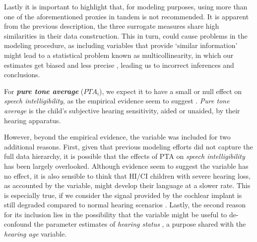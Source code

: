 Lastly it is important to highlight that, for modeling purposes, using more than one of the aforementioned proxies in tandem is not recommended. It is apparent from the previous description, the three surrogate measures share high similarities in their data construction. This in turn, could cause problems in the modeling procedure, as including variables that provide `similar information' might lead to a statistical problem known as multicollinearity, in which our estimates get biased and less precise \cite{Farrar_et_al_1967}, leading us to incorrect inferences and conclusions.
%
\begin{comment}
	for the NH group uses the child's \textit{age} (at recording), the method cannot use the same variable for the other two groups. This is due to the fact that \textit{age} is merely used as a proxy, for the amount of time a child has been developing his(her) language. In that sense, more appropriate variables to use under the HI/CI group would be e.g. the \textit{device length of use}, which approximates the ``hearing age'' of such children, or their \textit{vocabulary size}, which resembles their "lexical age" \citep{Faes_et_al_2021}. For this research, we consider the \textit{device length of use} as the simplest one to implement.
\end{comment}

For \textbf{\textit{pure tone average}} ($PTA_{i}$), we expect it to have a small or null effect on \textit{speech intelligibility}, as the empirical evidence seem to suggest \cite{Boonen_et_al_2021}. \textit{Pure tone average} is the child's subjective hearing sensitivity, aided or unaided, by their hearing apparatus. 

However, beyond the empirical evidence, the variable was included for two additional reasons. First, given that previous modeling efforts did not capture the full data hierarchy, it is possible that the effects of PTA on \textit{speech intelligibility} has been largely overlooked. Although evidence seem to suggest the variable has no effect, it is also sensible to think that HI/CI children with severe hearing loss, as accounted by the variable, might develop their language at a slower rate. This is especially true, if we consider the signal provided by the cochlear implant is still degraded compared to normal hearing scenarios \cite{Drennan_et_al_2008}. Lastly, the second reason for its inclusion lies in the possibility that the variable might be useful to de-confound the parameter estimates of \textit{hearing status} \cite{Cinelli_et_al_2021}, a purpose shared with the \textit{hearing age} variable. 

